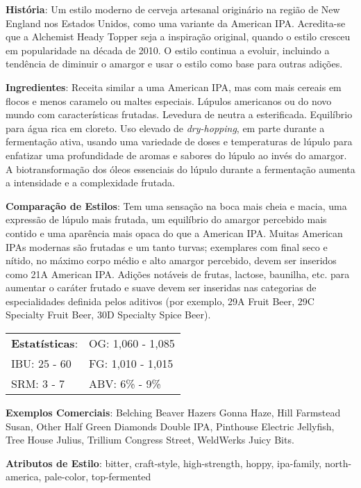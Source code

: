 \textbf{História}: Um estilo moderno de cerveja artesanal originário na região de New England nos Estados Unidos, como uma variante da American IPA. Acredita-se que a Alchemist Heady Topper seja a inspiração original, quando o estilo cresceu em popularidade na década de 2010. O estilo continua a evoluir, incluindo a tendência de diminuir o amargor e usar o estilo como base para outras adições.

\textbf{Ingredientes}: Receita similar a uma American IPA, mas com mais cereais em flocos e menos caramelo ou maltes especiais. Lúpulos americanos ou do novo mundo com características frutadas. Levedura de neutra a esterificada. Equilíbrio para água rica em cloreto. Uso elevado de \textit{dry-hopping}, em parte durante a fermentação ativa, usando uma variedade de doses e temperaturas de lúpulo para enfatizar uma profundidade de aromas e sabores do lúpulo ao invés do amargor. A biotransformação dos óleos essenciais do lúpulo durante a fermentação aumenta a intensidade e a complexidade frutada.

\textbf{Comparação de Estilos}: Tem uma sensação na boca mais cheia e macia, uma expressão de lúpulo mais frutada, um equilíbrio do amargor percebido mais contido e uma aparência mais opaca do que a American IPA. Muitas American IPAs modernas são frutadas e um tanto turvas; exemplares com final seco e nítido, no máximo corpo médio e alto amargor percebido, devem ser inseridos como 21A American IPA. Adições notáveis de frutas, lactose, baunilha, etc. para aumentar o caráter frutado e suave devem ser inseridas nas categorias de especialidades definida pelos aditivos (por exemplo, 29A Fruit Beer, 29C Specialty Fruit Beer, 30D Specialty Spice Beer).

\begin{tabular}{@{}p{35mm}p{35mm}@{}}
  \textbf{Estatísticas}: & OG: 1,060 - 1,085 \\
  IBU: 25 - 60  & FG: 1,010 - 1,015 \\
  SRM: 3 - 7  & ABV: 6\% - 9\%
\end{tabular}

\textbf{Exemplos Comerciais}: Belching Beaver Hazers Gonna Haze, Hill Farmstead Susan, Other Half Green Diamonds Double IPA, Pinthouse Electric Jellyfish, Tree House Julius, Trillium Congress Street, WeldWerks Juicy Bits.

\textbf{Atributos de Estilo}: bitter, craft-style, high-strength, hoppy, ipa-family, north-america, pale-color, top-fermented
